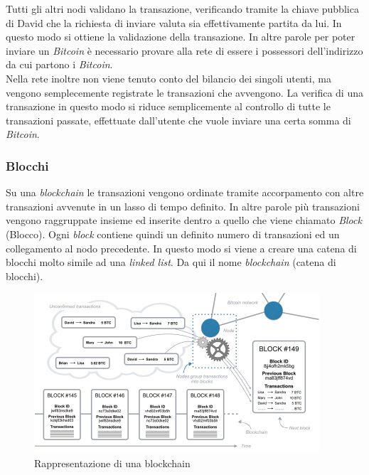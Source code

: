 \documentclass[11pt]{thesistemp}
\begin{document}
Tutti gli altri nodi validano la transazione, verificando tramite la chiave pubblica di David che la richiesta di inviare valuta sia effettivamente partita da lui.
In questo modo si ottiene la validazione della transazione.
In altre parole per poter inviare un \textit{Bitcoin} è necessario provare alla rete di essere i possessori dell'indirizzo da cui partono i \textit{Bitcoin}.\\
Nella rete inoltre non viene tenuto conto del bilancio dei singoli utenti, ma vengono semplecemente registrate le transazioni che avvengono.
La verifica di una transazione in questo modo si riduce semplicemente al controllo di tutte le transazioni passate, effettuate dall’utente che vuole inviare una certa somma di \textit{Bitcoin}.

\subsubsection{Blocchi}
Su una \textit{blockchain} le transazioni vengono ordinate tramite accorpamento con altre transazioni avvenute in un lasso di tempo definito.
In altre parole più transazioni vengono raggruppate insieme ed inserite dentro a quello che viene chiamato \textit{Block} (Blocco). 
Ogni \textit{block} contiene quindi un definito numero di transazioni ed un collegamento al nodo precedente. 
In questo modo si viene a creare una catena di blocchi molto simile ad una \textit{linked list}.
Da qui il nome \textit{blockchain} (catena di blocchi).
\begin{figure}[h]\hfill
    \centering
    \includegraphics[width=\textwidth]{blocks.png}
    \caption{Rappresentazione di una blockchain}
    \label{fig:blocks}
\end{figure}\\
\end{document}
